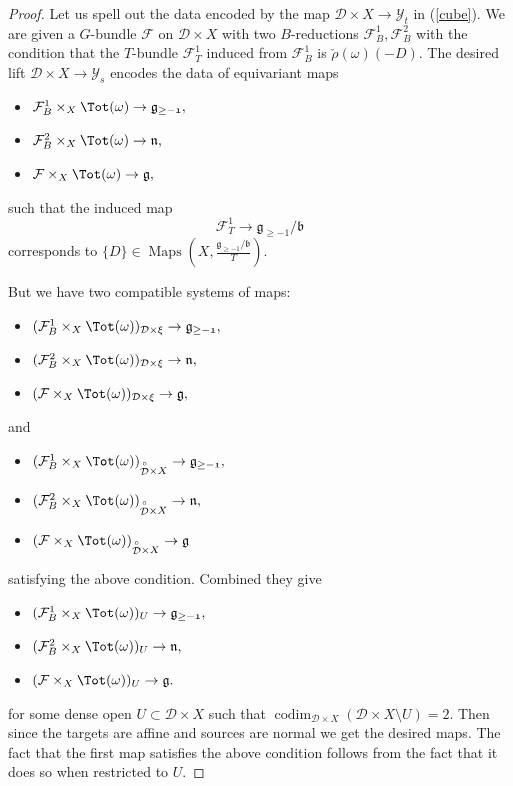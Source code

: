 \documentclass[9pt]{amsart}
\newcommand{\cD}{{\mathcal D}}
\newcommand{\cF}{{\mathcal F}}
\newcommand{\cY}{{\mathcal Y}}
\DeclareMathOperator{\Maps}{{Maps}}
\DeclareMathOperator{\codim}{{codim}}
\numberwithin{equation}{section}
\begin{document}
\begin{proof}
	Let us spell out the data encoded by the map $\cD \times X  \rightarrow \cY_t$ in (\ref{cube}). We are given a $G$-bundle $\cF$ on $\cD \times X$ with two $B$-reductions $\cF_B^1, \cF_B^2$ with the condition that the $T$-bundle $\cF_T^1$ induced from $\cF_B^1$ is $\check{\rho}(\omega)(-D)$. The desired lift $\cD \times X \rightarrow {\cY_s}$ encodes the data of equivariant maps 
	\begin{itemize}
		\item$\cF_B^1 \times_X \Tot(\omega) \rightarrow \mathfrak{g_{\geq -1}},$
		\item $\cF_B^2 \times_X \Tot(\omega) \rightarrow \mathfrak{n},$
		\item $\cF\times_X \Tot(\omega) \rightarrow \mathfrak{g},$
	\end{itemize}
	such that the induced map $$\cF_T^1 \rightarrow \mathfrak{g}_{\geq -1} / \mathfrak{b}$$
	corresponds to $\{D\} \in \Maps(X, \frac{\mathfrak{g}_{\geq -1} / \mathfrak{b}}{T})$.

	But we have two compatible systems of maps: 
		\begin{itemize}
		\item$(\cF_B^1 \times_X \Tot(\omega))_{\cD \times \xi} \rightarrow \mathfrak{g_{\geq -1}},$
		\item $(\cF_B^2 \times_X \Tot(\omega))_{\cD \times \xi}  \rightarrow \mathfrak{n},$
		\item $(\cF\times_X \Tot(\omega) )_{\cD \times \xi} \rightarrow \mathfrak{g},$
	\end{itemize}
and 
		\begin{itemize}
		\item$(\cF_B^1 \times_X \Tot(\omega))_{\stackrel{\circ}{\cD} \times X} \rightarrow \mathfrak{g_{\geq -1}},$
		\item $(\cF_B^2 \times_X \Tot(\omega))_{\stackrel{\circ}{\cD} \times X}  \rightarrow \mathfrak{n},$
		\item $(\cF\times_X \Tot(\omega) )_{\stackrel{\circ}{\cD} \times X} \rightarrow \mathfrak{g}$
	\end{itemize}
	satisfying the above condition. Combined they give 
	\begin{itemize}
		\item$(\cF_B^1 \times_X \Tot(\omega))_{U} \rightarrow \mathfrak{g_{\geq -1}},$
		\item $(\cF_B^2 \times_X \Tot(\omega))_{U}  \rightarrow \mathfrak{n},$
		\item $(\cF\times_X \Tot(\omega) )_{U} \rightarrow \mathfrak{g}.$
	\end{itemize}
	for some dense open $U \subset \cD \times X$ such that $\codim_{\cD \times X}(\cD \times X \setminus U) = 2$. Then since the targets are affine and sources are normal we get the desired maps. The fact that the first map satisfies the above condition follows from the fact that it does so when restricted to $U$. 
	

\end{proof}
\end{document}
